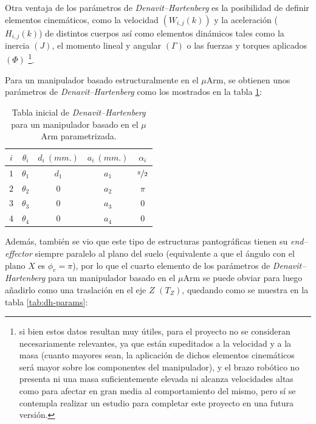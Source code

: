 Otra ventaja de los parámetros de \textit{Denavit--Hartenberg} es la posibilidad de
definir elementos cinemáticos\footnotemark[2], como la velocidad $\left(W_{i,j}(k)\right)$ y la aceleración ($H_{i,j}(k)$)
de distintos cuerpos así como elementos dinámicos tales como la inercia $\left(J\right)$,
el momento lineal y angular $\left(\Gamma\right)$ o las fuerzas y torques aplicados
$\left(\Phi\right)$ \footnote{si bien estos datos resultan muy útiles, para el proyecto no se consideran
    necesariamente relevantes, ya que están supeditados a la velocidad y a la masa (cuanto mayores sean,
    la aplicación de dichos elementos cinemáticos será mayor sobre los componentes del
    manipulador), y el brazo robótico no presenta ni una masa suficientemente elevada ni alcanza velocidades altas
    como para afectar en gran media al comportamiento del mismo, pero sí se contempla realizar un estudio para completar
    este proyecto en una futura versión.}.

Para un manipulador basado estructuralmente en el $\mu$Arm, se obtienen unos parámetros
de \textit{Denavit--Hartenberg} como los mostrados en la tabla \ref{tab:dh-params-with-phi}:

\begin{table}[H]
    \centering
    \begin{tabular}{ c | c c c c }
        $i$ & $\theta_i$ & $d_i~(mm.)$ & $a_i~(mm.)$ & $\alpha_i$          \\ [0.5ex]
        \hline
        $1$ & $\theta_1$ & $d_1$       & $a_1$       & $\nicefrac{\pi}{2}$ \\
        $2$ & $\theta_2$ & $0$         & $a_2$       & $\pi$               \\
        $3$ & $\theta_3$ & $0$         & $a_3$       & $0$                 \\
        $4$ & $\theta_4$ & $0$         & $a_4$       & $0$                 \\ [1ex]
    \end{tabular}
    \caption{Tabla inicial de \textit{Denavit–Hartenberg} para un manipulador basado en el $\mu$Arm parametrizada.}
    \label{tab:dh-params-with-phi}
\end{table}

Además, también se vio que este tipo de estructuras pantográficas
tienen su \textit{end--effector} siempre paralelo al plano del suelo (equivalente
a que el ángulo con el plano $X$ es $\phi_e = \pi$), por lo que el cuarto elemento de
los parámetros de \textit{Denavit--Hartenberg} para un manipulador basado en el $\mu$Arm
se puede obviar para luego añadirlo como una traslación en el eje $Z$ $\left(T_Z\right)$,
quedando como se muestra en la tabla \ref{tab:dh-params}:

